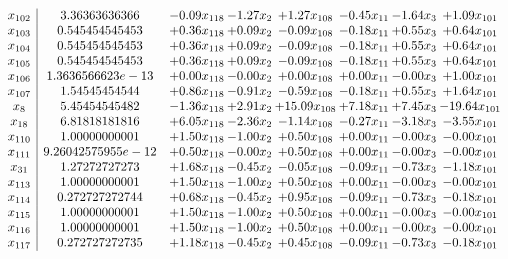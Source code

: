 \documentclass[8pt]{article}
\begin{document}
\[\begin{array}{c| c c@{\hskip 2pt} c@{\hskip 2pt} c@{\hskip 2pt} c@{\hskip 2pt} c@{\hskip 2pt} c@{\hskip 2pt} }
 x_{102}   &  3.36363636366 & -0.09 x_{118} & -1.27 x_{2} & +  1.27 x_{108} & -0.45 x_{11} & -1.64 x_{3} & +  1.09 x_{101}\\
 x_{103}   &  0.545454545453 & +  0.36 x_{118} & +  0.09 x_{2} & -0.09 x_{108} & -0.18 x_{11} & +  0.55 x_{3} & +  0.64 x_{101}\\
 x_{104}   &  0.545454545453 & +  0.36 x_{118} & +  0.09 x_{2} & -0.09 x_{108} & -0.18 x_{11} & +  0.55 x_{3} & +  0.64 x_{101}\\
 x_{105}   &  0.545454545453 & +  0.36 x_{118} & +  0.09 x_{2} & -0.09 x_{108} & -0.18 x_{11} & +  0.55 x_{3} & +  0.64 x_{101}\\
 x_{106}   &  1.3636566623e-13 & +  0.00 x_{118} & -0.00 x_{2} & +  0.00 x_{108} & +  0.00 x_{11} & -0.00 x_{3} & +  1.00 x_{101}\\
 x_{107}   &  1.54545454544 & +  0.86 x_{118} & -0.91 x_{2} & -0.59 x_{108} & -0.18 x_{11} & +  0.55 x_{3} & +  1.64 x_{101}\\
 x_{8}   &  5.45454545482 & -1.36 x_{118} & +  2.91 x_{2} & + 15.09 x_{108} & +  7.18 x_{11} & +  7.45 x_{3} & -19.64 x_{101}\\
 x_{18}   &  6.81818181816 & +  6.05 x_{118} & -2.36 x_{2} & -1.14 x_{108} & -0.27 x_{11} & -3.18 x_{3} & -3.55 x_{101}\\
 x_{110}   &  1.00000000001 & +  1.50 x_{118} & -1.00 x_{2} & +  0.50 x_{108} & +  0.00 x_{11} & -0.00 x_{3} & -0.00 x_{101}\\
 x_{111}   &  9.26042575955e-12 & +  0.50 x_{118} & -0.00 x_{2} & +  0.50 x_{108} & +  0.00 x_{11} & -0.00 x_{3} & -0.00 x_{101}\\
 x_{31}   &  1.27272727273 & +  1.68 x_{118} & -0.45 x_{2} & -0.05 x_{108} & -0.09 x_{11} & -0.73 x_{3} & -1.18 x_{101}\\
 x_{113}   &  1.00000000001 & +  1.50 x_{118} & -1.00 x_{2} & +  0.50 x_{108} & +  0.00 x_{11} & -0.00 x_{3} & -0.00 x_{101}\\
 x_{114}   &  0.272727272744 & +  0.68 x_{118} & -0.45 x_{2} & +  0.95 x_{108} & -0.09 x_{11} & -0.73 x_{3} & -0.18 x_{101}\\
 x_{115}   &  1.00000000001 & +  1.50 x_{118} & -1.00 x_{2} & +  0.50 x_{108} & +  0.00 x_{11} & -0.00 x_{3} & -0.00 x_{101}\\
 x_{116}   &  1.00000000001 & +  1.50 x_{118} & -1.00 x_{2} & +  0.50 x_{108} & +  0.00 x_{11} & -0.00 x_{3} & -0.00 x_{101}\\
 x_{117}   &  0.272727272735 & +  1.18 x_{118} & -0.45 x_{2} & +  0.45 x_{108} & -0.09 x_{11} & -0.73 x_{3} & -0.18 x_{101}\\

\end{array}\]
\end{document}
